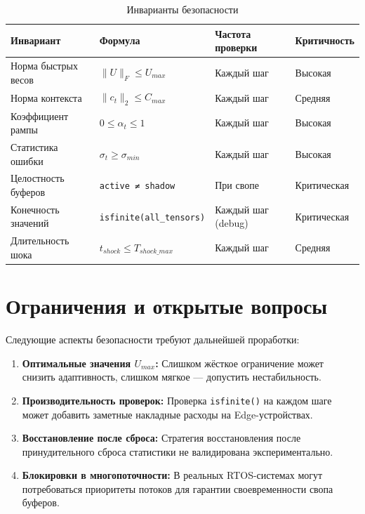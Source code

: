 \begin{table}[h]
\centering
\caption{Инварианты безопасности}
\label{tab:safety_invariants}
\begin{tabular}{lp{5cm}lp{2.5cm}}
\toprule
\textbf{Инвариант} & \textbf{Формула} & \textbf{Частота проверки} & \textbf{Критичность} \\
\midrule
Норма быстрых весов & $\|U\|_F \leq U_{max}$ & Каждый шаг & Высокая \\
Норма контекста & $\|c_t\|_2 \leq C_{max}$ & Каждый шаг & Средняя \\
Коэффициент рампы & $0 \leq \alpha_t \leq 1$ & Каждый шаг & Высокая \\
Статистика ошибки & $\sigma_t \geq \sigma_{min}$ & Каждый шаг & Высокая \\
Целостность буферов & \texttt{active ≠ shadow} & При свопе & Критическая \\
Конечность значений & \texttt{isfinite(all\_tensors)} & Каждый шаг (debug) & Критическая \\
Длительность шока & $t_{shock} \leq T_{shock\_max}$ & Каждый шаг & Средняя \\
\bottomrule
\end{tabular}
\end{table}

\section{Ограничения и открытые вопросы}

Следующие аспекты безопасности требуют дальнейшей проработки:

\begin{enumerate}
    \item \textbf{Оптимальные значения $U_{max}$:} Слишком жёсткое ограничение может снизить адаптивность, слишком мягкое — допустить нестабильность.
    
    \item \textbf{Производительность проверок:} Проверка \texttt{isfinite()} на каждом шаге может добавить заметные накладные расходы на Edge-устройствах.
    
    \item \textbf{Восстановление после сброса:} Стратегия восстановления после принудительного сброса статистики не валидирована экспериментально.
    
    \item \textbf{Блокировки в многопоточности:} В реальных RTOS-системах могут потребоваться приоритеты потоков для гарантии своевременности свопа буферов.
\end{enumerate}

